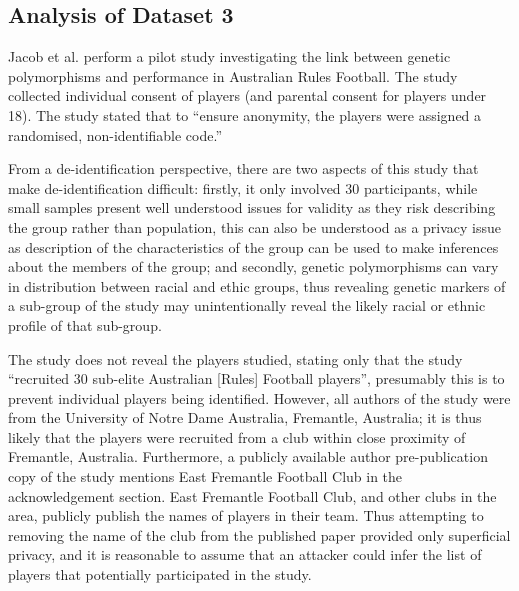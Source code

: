 \subsection{Analysis of Dataset 3}

Jacob et al. \cite{Jacob2016} perform a pilot study investigating the link between genetic polymorphisms and performance in Australian Rules Football. The study collected individual consent of players (and parental consent for players under 18). The study stated that to ``ensure anonymity, the players were assigned a randomised, non-identifiable code.''

From a de-identification perspective, there are two aspects of this study that make de-identification difficult: firstly, it only involved 30 participants, while small samples present well understood issues for validity as they risk describing the group rather than population, this can also be understood as a privacy issue as description of the characteristics of the group can be used to make inferences about the members of the group; and secondly, genetic polymorphisms can vary in distribution between racial and ethic groups, thus revealing genetic markers of a sub-group of the study may unintentionally reveal the likely racial or ethnic profile of that sub-group.

The study does not reveal the players studied, stating only that the study ``recruited 30 sub-elite Australian [Rules] Football players'', presumably this is to prevent individual players being identified. However, all authors of the study were from the University of Notre Dame Australia, Fremantle, Australia; it is thus likely that the players were recruited from a club within close proximity of Fremantle, Australia. Furthermore, a publicly available author pre-publication copy of the study mentions East Fremantle Football Club in the acknowledgement section. East Fremantle Football Club, and other clubs in the area, publicly publish the names of players in their team. Thus attempting to removing the name of the club from the published paper provided only superficial privacy, and it is reasonable to assume that an attacker could infer the list of players that potentially participated in the study.

